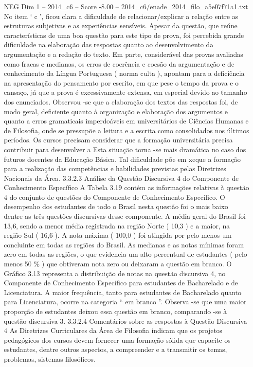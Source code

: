 \begin{textsample}{NEG Dim 1 – 2014\_c6 – Score -8.00 – 2014\_c6/enade\_2014\_filo\_a5e07f71a1.txt}
No item ‘ c ’, ficou clara a dificuldade de relacionar/explicar a relação entre as estruturas subjetivas e as experiências sensíveis.
Apesar da questão, que reúne características de uma boa questão para este tipo de prova, foi percebida grande dificuldade na elaboração das respostas quanto ao desenvolvimento da argumentação e a redação do texto.
Em parte, considerável das provas avaliadas como fracas e medianas, os erros de coerência e coesão da argumentação e de conhecimento da Língua Portuguesa ( norma culta ), apontam para a deficiência na apresentação do pensamento por escrito, em que pese o tempo da prova e o cansaço, já que a prova é excessivamente extensa, em especial devido ao tamanho dos enunciados.
Observou -se que a elaboração dos textos das respostas foi, de modo geral, deficiente quanto à organização e elaboração dos argumentos e quanto a erros gramaticais imperdoáveis em universitários de Ciências Humanas e de Filosofia, onde se pressupõe a leitura e a escrita como consolidados nos últimos períodos.
Os cursos precisam considerar que a formação universitária precisa contribuir para desenvolver a Esta situação torna -se mais dramática no caso dos futuros docentes da Educação Básica.
Tal dificuldade põe em xeque a formação para a realização das competências e habilidades previstas pelas Diretrizes Nacionais da Área. 3.3.2.3 Análise da Questão Discursiva 4 do Componente de Conhecimento Específico A Tabela 3.19 contém as informações relativas à questão 4 do conjunto de questões do Componente de Conhecimento Específico.
O desempenho dos estudantes de todo o Brasil nesta questão foi o mais baixo dentre as três questões discursivas desse componente.
A média geral do Brasil foi 13,6, sendo a menor média registrada na região Norte ( 10,3 ) e a maior, na região Sul ( 16,6 ).
A nota máxima ( 100,0 ) foi atingida por pelo menos um concluinte em todas as regiões do Brasil.
As medianas e as notas mínimas foram zero em todas as regiões, o que evidencia um alto percentual de estudantes ( pelo menos 50 \% ) que obtiveram nota zero ou deixaram a questão em branco.
O Gráfico 3.13 representa a distribuição de notas na questão discursiva 4, no Componente de Conhecimento Específico para estudantes de Bacharelado e de Licenciatura.
A maior frequência, tanto para estudantes de Bacharelado quanto para Licenciatura, ocorre na categoria “ em branco ”.
Observa -se que uma maior proporção de estudantes deixou essa questão em branco, comparando -se à questão discursiva 3. 3.3.2.4 Comentários sobre as respostas à Questão Discursiva 4 As Diretrizes Curriculares da Área de Filosofia indicam que os projetos pedagógicos dos cursos devem fornecer uma formação sólida que capacite os estudantes, dentre outros aspectos, a compreender e a transmitir os temas, problemas, sistemas filosóficos.

\end{textsample}
